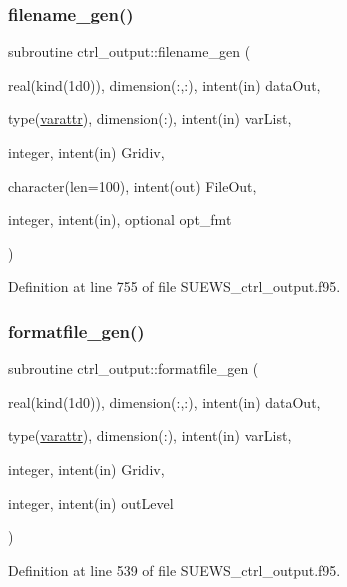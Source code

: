 \subsubsection{\texorpdfstring{filename\+\_\+gen()}{filename\_gen()}}
{\footnotesize\ttfamily subroutine ctrl\+\_\+output\+::filename\+\_\+gen (\begin{DoxyParamCaption}\item[{real(kind(1d0)), dimension(\+:,\+:), intent(in)}]{data\+Out,  }\item[{type(\hyperlink{structctrl__output_1_1varattr}{varattr}), dimension(\+:), intent(in)}]{var\+List,  }\item[{integer, intent(in)}]{Gridiv,  }\item[{character(len=100), intent(out)}]{File\+Out,  }\item[{integer, intent(in), optional}]{opt\+\_\+fmt }\end{DoxyParamCaption})}



Definition at line 755 of file S\+U\+E\+W\+S\+\_\+ctrl\+\_\+output.\+f95.

\mbox{\label{namespacectrl__output_a754f1fcb7692b22f531bcbd7fffd2634}} 
\subsubsection{\texorpdfstring{formatfile\+\_\+gen()}{formatfile\_gen()}}
{\footnotesize\ttfamily subroutine ctrl\+\_\+output\+::formatfile\+\_\+gen (\begin{DoxyParamCaption}\item[{real(kind(1d0)), dimension(\+:,\+:), intent(in)}]{data\+Out,  }\item[{type(\hyperlink{structctrl__output_1_1varattr}{varattr}), dimension(\+:), intent(in)}]{var\+List,  }\item[{integer, intent(in)}]{Gridiv,  }\item[{integer, intent(in)}]{out\+Level }\end{DoxyParamCaption})}



Definition at line 539 of file S\+U\+E\+W\+S\+\_\+ctrl\+\_\+output.\+f95.

